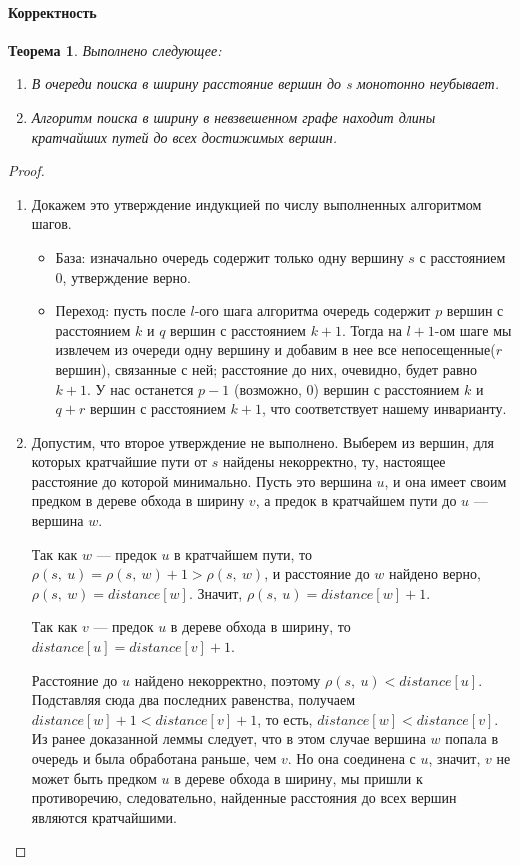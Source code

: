 \documentclass[a4paper,12pt]{article}
\newtheorem*{theorem}{Теорема}
\begin{document}
\paragraph{Корректность}

\begin{theorem}
    Выполнено следующее:
    \begin{enumerate}
        \item В очереди поиска в ширину расстояние вершин до s монотонно неубывает.
        \item Алгоритм поиска в ширину в невзвешенном графе находит длины кратчайших путей до всех достижимых вершин.
    \end{enumerate}
\end{theorem}
\begin{proof}
\begin{enumerate}
    \item Докажем это утверждение индукцией по числу выполненных алгоритмом шагов.
    \begin{itemize}
        \item База: изначально очередь содержит только одну вершину $s$ с расстоянием 0, утверждение верно.
        \item Переход: пусть после $l$-ого шага алгоритма очередь содержит $p$ вершин с расстоянием $k$ и $q$ вершин с расстоянием $k + 1$. Тогда на $l+1$-ом шаге мы извлечем из очереди одну вершину и добавим в нее все непосещенные($r$ вершин), связанные с ней; расстояние до них, очевидно, будет равно $k + 1$. У нас останется $p - 1$ (возможно, 0) вершин с расстоянием $k$ и $q + r$ вершин с расстоянием $k + 1$, что соответствует нашему инварианту.
    \end{itemize}
    \item Допустим, что второе утверждение не выполнено. Выберем из вершин, для которых кратчайшие пути от $s$ найдены некорректно, ту, настоящее расстояние до которой минимально. Пусть это вершина $u$, и она имеет своим предком в дереве обхода в ширину $v$, а предок в кратчайшем пути до $u$ — вершина $w$.

    Так как $w$ — предок $u$ в кратчайшем пути, то $\rho(s,\ u) = \rho(s,\ w) + 1 > \rho(s,\ w)$, и расстояние до $w$ найдено верно, $\rho(s,\ w) = distance[w]$. Значит, $\rho(s,\ u) = distance[w] + 1$.

    Так как $v$ — предок $u$ в дереве обхода в ширину, то $distance[u] = distance[v] + 1$.

    Расстояние до $u$ найдено некорректно, поэтому $\rho(s,\ u) < distance[u]$. Подставляя сюда два последних равенства, получаем $distance[w] + 1 < distance[v] + 1$, то есть, $distance[w] < distance[v]$. Из ранее доказанной леммы следует, что в этом случае вершина $w$ попала в очередь и была обработана раньше, чем $v$. Но она соединена с $u$, значит, $v$ не может быть предком $u$ в дереве обхода в ширину, мы пришли к противоречию, следовательно, найденные расстояния до всех вершин являются кратчайшими.
\end{enumerate}
\end{proof}
\end{document}
